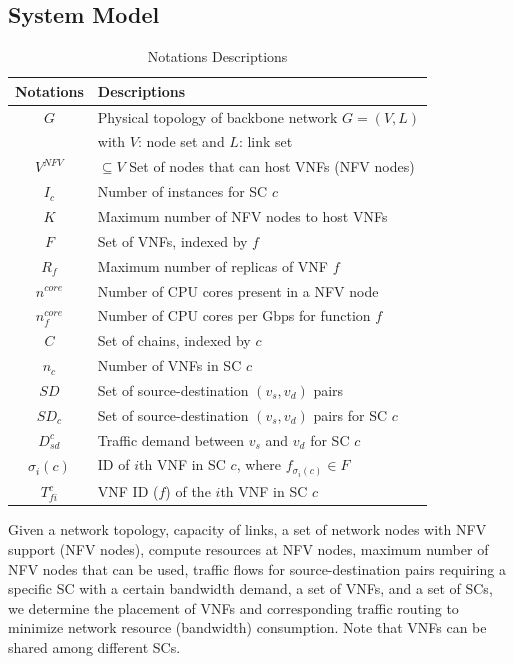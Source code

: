 \documentclass[12pt]{article}
\begin{document}
\subsection{System Model}
\begin{table}[t!]
\centering
\begin{tabular}{|c l|} 
 \hline
 Notations & Descriptions \\ [0.5ex] 
 \hline 
 $G$ & Physical topology of backbone network $G = (V,L)$\\ 
& with $V$: node set and $L$: link set\\ 
 $V^{NFV}$ & $ \subseteq V$ Set of nodes that can host VNFs (NFV nodes) \\
 $I_c$ & Number of instances for SC $c$ \\
 $K$& Maximum number of NFV nodes to host VNFs\\
 $F$&Set of VNFs, indexed by $f$\\
 $R_f$& Maximum number of replicas of VNF $f$\\
 $n^{core}$&Number of CPU cores present in a NFV node\\
 $n^{core}_f$& Number of CPU cores per Gbps for function $f$\\
 $C$& Set of chains, indexed by $c$\\
 $n_c$& Number of VNFs in SC $c$\\
 $SD$&Set of source-destination $(v_s, v_d)$ pairs\\
 $SD_c$&Set of source-destination $(v_s, v_d)$ pairs for SC $c$\\
 $D_{sd}^c$&Traffic demand between $v_s$ and $v_d$ for SC $c$\\
 $\sigma_i (c)$& ID of $i$th VNF in SC $c$, where $f_{\sigma_i (c)} \in F$\\
 $T_{fi}^c$& VNF ID ($f$) of the $i$th VNF in SC $c$\\[1ex] 
 \hline
\end{tabular}
\caption{Notations Descriptions}
\label{table:2}
\end{table}
Given a network topology, capacity of links, a set of network nodes with NFV support (NFV nodes), compute resources at NFV nodes, maximum number of NFV nodes that can be used, traffic flows for source-destination pairs requiring a specific SC with a certain bandwidth demand, a set of VNFs, and a set of SCs, we determine the placement of VNFs and corresponding traffic routing to minimize network resource (bandwidth) consumption. Note that VNFs can be shared among different SCs.
\end{document}
